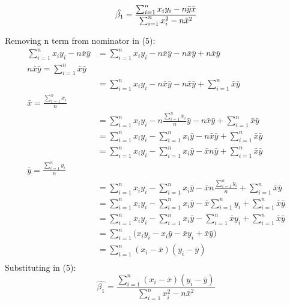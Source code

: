 \documentclass{article}
\begin{document}
\begin{equation}
\hat{\beta_1} =  \frac{\sum_{i=1}^{n}x_i y_i- n\bar{y}\bar{x}}{\sum_{i=1}^{n}x_i^2 - n\bar{x}^2} \\ \label{eq:5}
\end{equation}


Removing n term from nominator in (5):
\begin{align*}
\sum_{i=1}^{n}  x_i y_i - n\bar{x}\bar{y} & = \sum_{i=1}^{n}x_i y_i - n\bar{x}\bar{y} - n\bar{x}\bar{y} + n\bar{x}\bar{y} \\ %
n\bar{x}\bar{y} = \sum_{i=1}^{n}\bar{x}\bar{y} \\ %
& = \sum_{i=1}^{n}x_i y_i - n\bar{x}\bar{y} - n\bar{x}\bar{y} + \sum_{i=1}^{n}\bar{x}\bar{y} \\ %
\bar{x} = \frac{\sum_{i=1}^{n}x_i}{n} \\ %
& = \sum_{i=1}^{n}x_i y_i - n\frac{\sum_{i=1}^{n}x_i}{n}\bar{y} - n\bar{x}\bar{y} + \sum_{i=1}^{n}\bar{x}\bar{y} \\ %
& = \sum_{i=1}^{n}x_i y_i - \sum_{i=1}^{n}x_i\bar{y} - n\bar{x}\bar{y} + \sum_{i=1}^{n}\bar{x}\bar{y} \\ %
& = \sum_{i=1}^{n}x_i y_i - \sum_{i=1}^{n}x_i\bar{y} - \bar{x}n\bar{y} + \sum_{i=1}^{n}\bar{x}\bar{y} \\ %
 \bar{y} = \frac{\sum_{i=1}^{n}y_i}{n} \\  %
& = \sum_{i=1}^{n}x_i y_i - \sum_{i=1}^{n}x_i\bar{y} - \bar{x}n\frac{\sum_{i=1}^{n}y_i}{n} + \sum_{i=1}^{n}\bar{x}\bar{y}  \\ %
& = \sum_{i=1}^{n}x_i y_i - \sum_{i=1}^{n}x_i\bar{y} - \bar{x}\sum_{i=1}^{n}y_i + \sum_{i=1}^{n}\bar{x}\bar{y} \\ %
& = \sum_{i=1}^{n}x_i y_i - \sum_{i=1}^{n}x_i\bar{y} - \sum_{i=1}^{n}\bar{x}y_i + \sum_{i=1}^{n}\bar{x}\bar{y} \\ %
& = \sum_{i=1}^{n}\big(x_i y_i - x_i \bar{y} - \bar{x}y_i + \bar{x}\bar{y}\big) \\ %
& = \sum_{i=1}^{n}(x_i - \bar{x})(y_i - \bar{y}) \\
\end{align*}
Substituting in (5):
\begin{equation}
\hat{\beta_1}=  \frac{\sum_{i=1}^{n}(x_i - \bar{x})(y_i - \bar{y})}{\sum_{i=1}^{n}x_i^2 - n\bar{x}^2}  \label{eq:6}
\end{equation}
\end{document}

